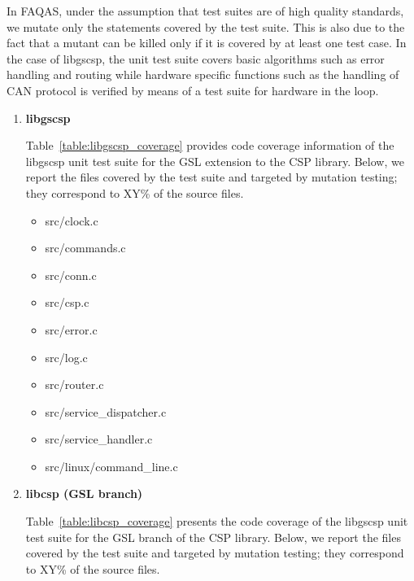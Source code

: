 In FAQAS, under the assumption that test suites are of high quality standards, we mutate only the statements covered by the test suite. This is also due to the fact that a mutant can be killed only if it is covered by at least one test case. In the case of libgscsp, the unit test suite covers basic algorithms such as error handling and routing while hardware specific functions such as the handling of CAN protocol is verified by means of a test suite for hardware in the loop. 


	

\begin{enumerate}
	\item \textbf{libgscsp}

	Table~\ref{table:libgscsp_coverage} provides code coverage information of the libgscsp unit test suite for the GSL extension to the CSP library. Below, we report the files covered by the test suite and targeted by mutation testing; they correspond to XY\% of the source files.
	

	\begin{itemize}
	 	\item src/clock.c
	 	\item src/commands.c
	 	\item src/conn.c
	 	\item src/csp.c
	 	\item src/error.c
	 	\item src/log.c
	 	\item src/router.c
	 	\item src/service\_dispatcher.c
	 	\item src/service\_handler.c
	 	\item src/linux/command\_line.c

	 \end{itemize} 

	\item \textbf{libcsp (GSL branch)}

	Table~\ref{table:libcsp_coverage} presents the code coverage of the libgscsp unit test suite for the GSL branch of the CSP library. 
Below, we report the files covered by the test suite and targeted by mutation testing; they correspond to XY\% of the source files.


\end{enumerate}
